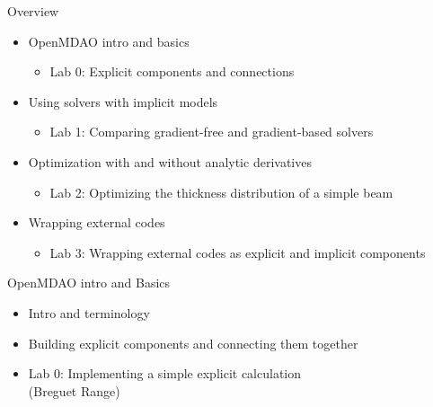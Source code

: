 \documentclass[aspectratio=169, usenames,dvipsnames, 14pt]{beamer}
\begin{document}
\begin{frame}{Overview}
    \begin{itemize}
        \item OpenMDAO intro and basics
          \begin{itemize}
            \item Lab 0: Explicit components and connections
          \end{itemize}
    \vspace{.5cm}
    
        \item Using solvers with implicit models
          \begin{itemize}
            \item Lab 1: Comparing gradient-free and gradient-based solvers
          \end{itemize}
    \vspace{.5cm}
    
        \item Optimization with and without analytic derivatives
          \begin{itemize}
              \item Lab 2: Optimizing the thickness distribution of a simple beam
          \end{itemize}
    \vspace{.5cm}
    
        \item Wrapping external codes
          \begin{itemize}
              \item Lab 3: Wrapping external codes as explicit and implicit components
          \end{itemize}
    \end{itemize}
    
\end{frame}
\begingroup
{}
\begin{frame}{OpenMDAO intro and Basics}

    \begin{itemize}
        \item Intro and terminology 
        \vspace{0.5cm}
        \item Building explicit components and connecting them together
        \vspace{0.5cm}
        \item Lab 0: Implementing a simple explicit calculation \\(Breguet Range)
    \end{itemize}
    
\end{frame}
\endgroup
\end{document}
